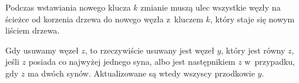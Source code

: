 
\subproblem %
Podczas wstawiania nowego klucza $k$ zmianie muszą ulec wszystkie węzły na ścieżce od korzenia drzewa do nowego węzła z~kluczem $k$, który staje się nowym liściem drzewa.

Gdy usuwamy węzeł $z$, to rzeczywiście usuwany jest węzeł $y$, który jest równy $z$, jeśli $z$ posiada co najwyżej jednego syna, albo jest następnikiem $z$ w~przypadku, gdy $z$ ma dwóch synów.
Aktualizowane są wtedy wszyscy przodkowie $y$.

\subproblem %
\subproblem %
\subproblem %
\subproblem %
